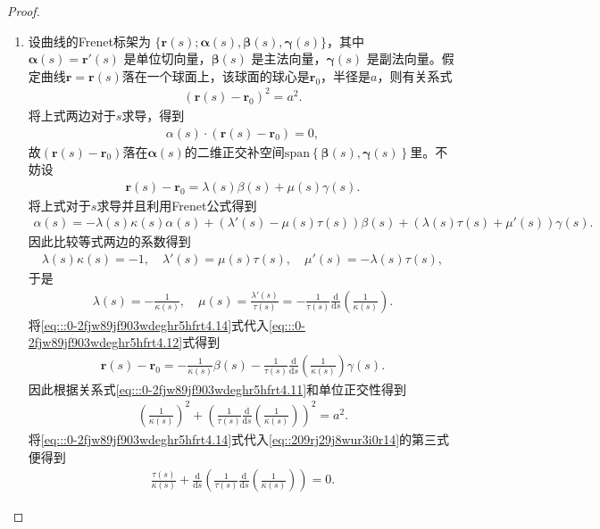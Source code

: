 \documentclass[../../main.tex]{subfiles}%
\begin{document}
\begin{proof}
\begin{enumerate}[(1)]
\item 设曲线的Frenet标架为 $\{\bm{r}(s); \bm{\alpha}(s), \bm{\beta}(s), \bm{\gamma}(s)\}$，其中 $\bm{\alpha}(s)=\bm{r}'(s)$ 是单位切向量，$\bm{\beta}(s)$ 是主法向量，$\bm{\gamma}(s)$ 是副法向量。假定曲线$\bm{r} = \bm{r}(s)$落在一个球面上，该球面的球心是$\bm{r}_0$，半径是$a$，则有关系式
\begin{align}
(\bm{r}(s) - \bm{r}_0)^2 = a^2. \label{eq:::0-2fjw89jf903wdeghr5hfrt4.11}
\end{align}
将上式两边对于$s$求导，得到
\begin{align*}
\alpha(s) \cdot (\bm{r}(s) - \bm{r}_0) = 0,
\end{align*}
故$(\bm{r}(s) - \bm{r}_0)$落在$\bm{\alpha}(s)$的二维正交补空间$\mathrm{span}\left\{ \boldsymbol{\beta }\left( s \right) ,\boldsymbol{\gamma }\left( s \right) \right\}$里。不妨设
\begin{align}
\bm{r}(s) - \bm{r}_0 = \lambda(s) \beta(s) + \mu(s) \gamma(s). \label{eq:::0-2fjw89jf903wdeghr5hfrt4.12}
\end{align}
将上式对于$s$求导并且利用Frenet公式得到
\begin{align*}
\alpha(s) = -\lambda(s) \kappa(s) \alpha(s) + (\lambda'(s) - \mu(s) \tau(s)) \beta(s) + (\lambda(s) \tau(s) + \mu'(s)) \gamma(s).
\end{align*}
因此比较等式两边的系数得到
\begin{align}\label{eq::209rj29j8wur3i0r14}
\lambda(s) \kappa(s) = -1,\quad \lambda'(s) = \mu(s) \tau(s),\quad \mu'(s) = -\lambda(s) \tau(s),
\end{align}
于是
\begin{align}
\lambda(s) = -\frac{1}{\kappa(s)},\quad \mu(s) = \frac{\lambda'(s)}{\tau(s)} = -\frac{1}{\tau(s)} \frac{\mathrm{d}}{\mathrm{d}s} \left( \frac{1}{\kappa(s)} \right).
\label{eq:::0-2fjw89jf903wdeghr5hfrt4.14}
\end{align}
将\eqref{eq:::0-2fjw89jf903wdeghr5hfrt4.14}式代入\eqref{eq:::0-2fjw89jf903wdeghr5hfrt4.12}式得到
\begin{align*}
\bm{r}(s) - \bm{r}_0 = -\frac{1}{\kappa(s)} \beta(s) - \frac{1}{\tau(s)} \frac{\mathrm{d}}{\mathrm{d}s} \left( \frac{1}{\kappa(s)} \right) \gamma(s).
\end{align*}
因此根据关系式\eqref{eq:::0-2fjw89jf903wdeghr5hfrt4.11}和单位正交性得到
\begin{align*}
\left( \frac{1}{\kappa(s)} \right)^2 + \left( \frac{1}{\tau(s)} \frac{\mathrm{d}}{\mathrm{d}s} \left( \frac{1}{\kappa(s)} \right) \right)^2 = a^2.
\end{align*}
将\eqref{eq:::0-2fjw89jf903wdeghr5hfrt4.14}式代入\eqref{eq::209rj29j8wur3i0r14}的第三式便得到
\begin{align*}
\frac{\tau(s)}{\kappa(s)} + \frac{\mathrm{d}}{\mathrm{d}s} \left( \frac{1}{\tau(s)} \frac{\mathrm{d}}{\mathrm{d}s} \left( \frac{1}{\kappa(s)} \right) \right) = 0.
\end{align*}


\end{enumerate}
\end{proof}
\end{document}
